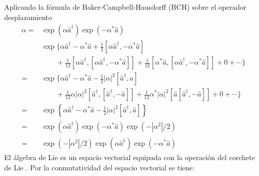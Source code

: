 \begin{enumerate}
        Aplicando la fórmula de Baker-Campbell-Hausdorff (BCH) sobre el operador desplazamiento
        \begin{align*}
          \displaystyle{\alpha} = & \exp{(\alpha \hat{a}^{\dagger})}\exp{(-\alpha^* \hat{a})}                                                                                                                                    \\
                                  & \exp \Bigg\{ \alpha \hat{a}^{\dagger} - \alpha^* \hat{a} + \frac{1}{2}[\alpha\hat{a}^{\dagger}, - \alpha^* \hat{a}]                                                                          \\
                                  & \qquad +\frac{1}{12}[\alpha\hat{a}^{\dagger},[\alpha\hat{a}^{\dagger}, - \alpha^*\hat{a}]] +\frac{1}{12}[\alpha^*\hat{a},[\alpha\hat{a}^{\dagger}, - \alpha^* \hat{a}]] + 0 + \cdots \Bigg\} \\
          =                       & \exp \Bigg\{ \alpha \hat{a}^{\dagger} - \alpha^* \hat{a} - \frac{1}{2}|\alpha|^2[\hat{a}^{\dagger},\hat{a}]                                                                                  \\
                                  & \qquad +\frac{1}{12}\alpha |\alpha|^2[\hat{a}^{\dagger},[\hat{a}^{\dagger},-\hat{a}]] +\frac{1}{12}\alpha^*|\alpha|^2[\hat{a}[\hat{a}^{\dagger},-\hat{a}]] + 0 + \cdots \Bigg\}              \\
          =                       & \exp \left\{ \alpha \hat{a}^{\dagger} - \alpha^{*}\hat{a} - \frac{1}{2}|\alpha|^2[\hat{a}^{\dagger},\hat{a}] \right\}                                                                        \\
          =                       & \exp(\alpha\hat{a}^{\dagger})\exp(-\alpha^{*} \hat{a})\exp(-|\alpha^2|/2)                                                                                                                    \\
          =                       & \exp(-|\alpha^2|/2)\exp(\alpha\hat{a}^{\dagger})\exp(-\alpha^{*} \hat{a})
        \end{align*}
        El álgebra de Lie es un espacio vectorial equipada con la operación del corchete de Lie \cite{schwichtenberg2015physics}. Por la conmutatividad del espacio vectorial se tiene:


\end{enumerate}
